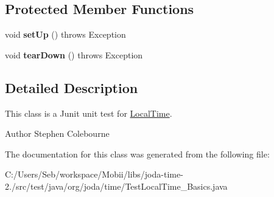 \subsection*{Protected Member Functions}
\begin{DoxyCompactItemize}
\item 
\hypertarget{classorg_1_1joda_1_1time_1_1_test_local_time___basics_a6063ea3b60e059a8d8a5d9351eb9b25f}{void {\bfseries set\-Up} ()  throws Exception }\label{classorg_1_1joda_1_1time_1_1_test_local_time___basics_a6063ea3b60e059a8d8a5d9351eb9b25f}

\item 
\hypertarget{classorg_1_1joda_1_1time_1_1_test_local_time___basics_a5a762a41723d522be3ad384ac74e3dc0}{void {\bfseries tear\-Down} ()  throws Exception }\label{classorg_1_1joda_1_1time_1_1_test_local_time___basics_a5a762a41723d522be3ad384ac74e3dc0}

\end{DoxyCompactItemize}


\subsection{Detailed Description}
This class is a Junit unit test for \hyperlink{classorg_1_1joda_1_1time_1_1_local_time}{Local\-Time}.

\begin{DoxyAuthor}{Author}
Stephen Colebourne 
\end{DoxyAuthor}


The documentation for this class was generated from the following file\-:\begin{DoxyCompactItemize}
\item 
C\-:/\-Users/\-Seb/workspace/\-Mobii/libs/joda-\/time-\/2./src/test/java/org/joda/time/Test\-Local\-Time\-\_\-\-Basics.\-java\end{DoxyCompactItemize}
